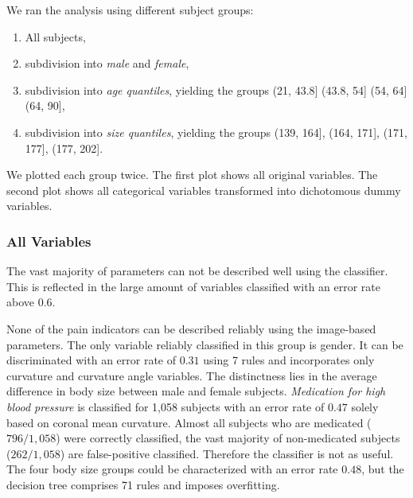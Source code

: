 \documentclass[a4paper,twoside]{style/article}
\begin{document}
We ran the analysis using different subject groups:
\begin{enumerate}
	\item All subjects,
	\item subdivision into \emph{male} and \emph{female},
	\item subdivision into \emph{age quantiles}, yielding the groups (21, 43.8] (43.8, 54] (54, 64] (64, 90],
	\item subdivision into \emph{size quantiles}, yielding the groups (139, 164], (164, 171], (171, 177], (177, 202].
\end{enumerate}
We plotted each group twice.
The first plot shows all original variables.
The second plot shows all categorical variables transformed into dichotomous dummy variables.

\subsubsection{All Variables}
The vast majority of parameters can not be described well using the classifier.
This is reflected in the large amount of variables classified with an error rate above $0.6$.

None of the pain indicators can be described reliably using the image-based parameters.
The only variable reliably classified in this group is gender. %
%
It can be discriminated with an error rate of $0.31$ using 7 rules and incorporates only curvature and curvature angle variables.
The distinctness lies in the average difference in body size between male and female subjects.
%
\emph{Medication for high blood pressure} is classified for 1,058 subjects with an error rate of $0.47$ solely based on coronal mean curvature.
Almost all subjects who are medicated ($796/1,058$) were correctly classified, the vast majority of non-medicated subjects ($262/1,058$) are false-positive classified.
Therefore the classifier is not as useful.
The four body size groups could be characterized with an error rate $0.48$, but the decision tree comprises 71 rules and imposes overfitting.
\end{document}
